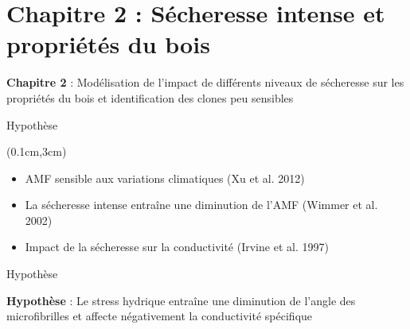 \documentclass{beamer}
\begin{document}
\section{Chapitre 2 : Sécheresse intense et propriétés du bois}
\begin{frame}%
\Large	\textbf{Chapitre 2} : Modélisation de l’impact de différents niveaux de sécheresse sur les propriétés du bois et identification des clones peu sensibles\\
	
\end{frame}
\begin{frame}{Hypothèse}
\begin{textblock*}{12cm}(0.1cm,3cm)
	\begin{itemize} %
		\item AMF sensible aux variations climatiques (Xu et al. 2012)\\
		\vspace{0.7cm}
		\item La sécheresse intense entraîne une diminution de l'AMF (Wimmer et al. 2002)\\
		\vspace{0.7cm}
		\item Impact de la sécheresse sur la conductivité (Irvine et al. 1997)\\
	\end{itemize}
\end{textblock*}
\end{frame}

\begin{frame}{Hypothèse}
	
\Large	\textbf{Hypothèse} : Le stress hydrique entraîne une diminution de l’angle des microfibrilles et affecte négativement la conductivité spécifique
	
\end{frame}
\end{document}
